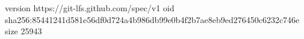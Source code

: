 version https://git-lfs.github.com/spec/v1
oid sha256:85441241d581e56df0d724a4b986db99e0b4f2b7ae8eb9ed276450c6232c746e
size 25943
